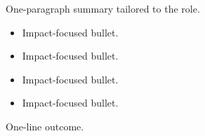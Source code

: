 \documentclass[10pt,a4paper]{altacv}
\begin{document}

\begin{fullwidth}
\makecvheader
\end{fullwidth}

One-paragraph summary tailored to the role.


\begin{itemize}
\item Impact-focused bullet.
\item Impact-focused bullet.
\end{itemize}
\divider

\begin{itemize}
\item Impact-focused bullet.
\item Impact-focused bullet.
\end{itemize}
\divider


One-line outcome.
\divider
\end{document}
